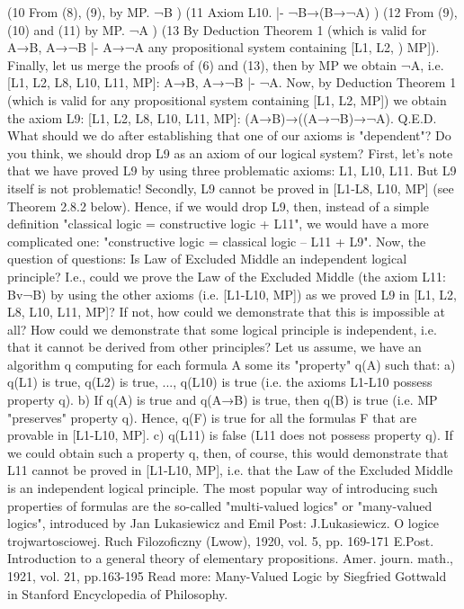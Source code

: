 (10 From (8), (9), by MP.
¬B 
 ) 
(11 Axiom L10.
|- ¬B→(B→¬A) 
      ) 
(12 From (9), (10) and (11) by MP.
¬A 
 ) 
(13 By Deduction Theorem 1 (which is valid for
A→B, A→¬B |- A→¬A any propositional system containing [L1, L2,
        ) MP]).
Finally, let us merge the proofs of (6) and (13), then by MP we obtain ¬A, i.e.
[L1, L2, L8, L10, L11, MP]: A→B, A→¬B |- ¬A.
Now, by Deduction Theorem 1 (which is valid for any propositional system containing [L1, L2, MP]) we
obtain the axiom L9:
[L1, L2, L8, L10, L11, MP]: (A→B)→((A→¬B)→¬A).
Q.E.D.
What should we do after establishing that one of our axioms is "dependent"?
Do you think, we should drop L9 as an axiom of our logical system?
First, let's note that we have proved L9 by using three problematic axioms: L1, L10, L11. But L9 itself is
not problematic!
Secondly, L9 cannot be proved in [L1-L8, L10, MP] (see Theorem 2.8.2 below). Hence, if we would drop
L9, then, instead of a simple definition
"classical logic = constructive logic + L11",
we would have a more complicated one:
"constructive logic = classical logic – L11 + L9".
Now, the question of questions:
Is Law of Excluded Middle an independent logical principle?
I.e., could we prove the Law of the Excluded Middle (the axiom L11: Bv¬B) by using the other axioms
(i.e. [L1-L10, MP]) as we proved L9 in [L1, L2, L8, L10, L11, MP]? If not, how could we demonstrate that
this is impossible at all? How could we demonstrate that some logical principle is independent, i.e. that it
cannot be derived from other principles?
Let us assume, we have an algorithm q computing for each formula A some its "property" q(A) such that:
a) q(L1) is true, q(L2) is true, ..., q(L10) is true (i.e. the axioms L1-L10 possess property q).
b) If q(A) is true and q(A→B) is true, then q(B) is true (i.e. MP "preserves" property q). Hence, q(F) is
true for all the formulas F that are provable in [L1-L10, MP].
c) q(L11) is false (L11 does not possess property q).
If we could obtain such a property q, then, of course, this would demonstrate that L11 cannot be proved in
[L1-L10, MP], i.e. that the Law of the Excluded Middle is an independent logical principle.
The most popular way of introducing such properties of formulas are the so-called "multi-valued logics"
or "many-valued logics", introduced by Jan Lukasiewicz and Emil Post:
J.Lukasiewicz. O logice trojwartosciowej. Ruch Filozoficzny (Lwow), 1920, vol. 5, pp. 169-171
E.Post. Introduction to a general theory of elementary propositions. Amer. journ. math., 1921, vol. 21, pp.163-195
Read more: Many-Valued Logic by Siegfried Gottwald in Stanford Encyclopedia of Philosophy.
